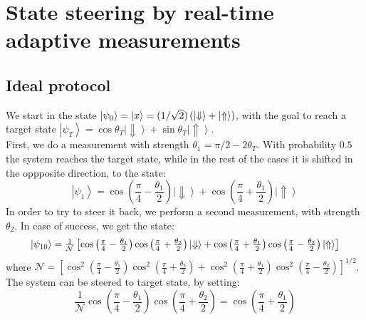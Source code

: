 \section*{State steering by real-time adaptive measurements}
\label{sec:steeringpartmsmnt}
\subsection*{Ideal protocol}
We start in the state $\left| \psi_0 \right \rangle = \left|x\right> = (1/\sqrt{2}) \left(\left| \Downarrow \right \rangle + \left| \Uparrow \right \rangle \right)$, with the goal to reach a target state $\left| \psi_T \right \rangle = \cos\theta_T \left| \Downarrow \right \rangle + \sin\theta_T \left| \Uparrow \right \rangle$.\\
First, we do a measurement with strength $\theta_1 = \pi/2-2\theta_T$. With probability $0.5$ the system reaches the target state, while in the rest of the cases it is shifted in the oppposite direction, to the state:
\begin{equation}
\left| \psi_1 \right \rangle = \cos \left( \frac{\pi}{4} - \frac{\theta_1}{2} \right) \left| \Downarrow \right \rangle + \cos \left( \frac{\pi}{4} + \frac{\theta_1}{2} \right) \left| \Uparrow \right \rangle
\end{equation}
In order to try to steer it back, we perform a second measurement, with strength $\theta_2$. In case of success, we get the state:
\begin{equation}
\resizebox{.9\hsize}{!}{$
\left| \psi_{10} \right \rangle = \frac{1}{\mathcal{N}} \left[ \cos \left( \frac{\pi}{4} - \frac{\theta_1}{2} \right)\cos \left( \frac{\pi}{4} + \frac{\theta_2}{2} \right) \left| \Downarrow \right \rangle + \cos \left( \frac{\pi}{4} + \frac{\theta_1}{2} \right)\cos \left( \frac{\pi}{4} - \frac{\theta_2}{2} \right) \left| \Uparrow \right \rangle \right]
$}
\end{equation}
where $\mathcal{N} = \left[ \cos^{2} \left( \frac{\pi}{4} - \frac{\theta_1}{2} \right)\cos^2 \left( \frac{\pi}{4} + \frac{\theta_2}{2} \right) + \cos^2 \left( \frac{\pi}{4} + \frac{\theta_1}{2} \right) \cos^2 \left( \frac{\pi}{4} - \frac{\theta_2}{2} \right) \right]^{1/2}$.
The system can be steered to target state, by setting:
\begin{equation}
 \frac{1}{\mathcal{N}} \cos \left( \frac{\pi}{4} - \frac{\theta_1}{2} \right)\cos \left( \frac{\pi}{4} + \frac{\theta_2}{2} \right) = \cos \left( \frac{\pi}{4} + \frac{\theta_1}{2} \right)
\end{equation}
